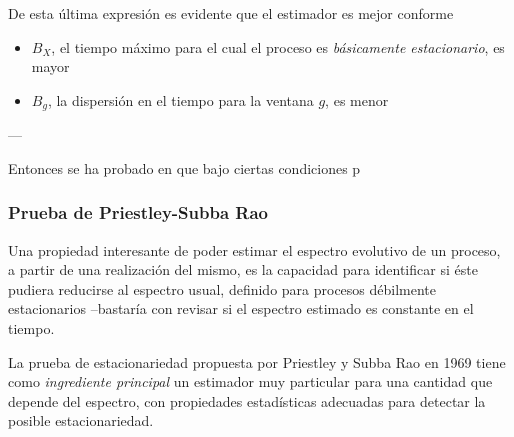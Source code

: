 De esta última expresión es evidente que el estimador es mejor conforme 
\begin{itemize}
\item  $B_X$, el tiempo
máximo para el cual el proceso es \textit{básicamente estacionario}, es mayor
\item $B_g$, la dispersión en el tiempo para la ventana $g$, es menor
\end{itemize}

---

Entonces se ha probado en \cite{Priestley66,Priestley69} que bajo ciertas
condiciones p

\subsubsection{Prueba de Priestley-Subba Rao}

Una propiedad interesante de poder estimar el espectro evolutivo de un proceso, a partir de
una realización del mismo, es la 
capacidad para identificar si éste pudiera reducirse al
espectro usual, definido para procesos débilmente estacionarios --bastaría
con revisar si el espectro estimado es constante en el tiempo.

La prueba de estacionariedad propuesta por Priestley y Subba Rao en 1969 \cite{Priestley69}
tiene como \textit{ingrediente principal} un estimador muy particular para una cantidad que depende 
del espectro, con
propiedades estadísticas adecuadas para detectar la posible estacionariedad.



